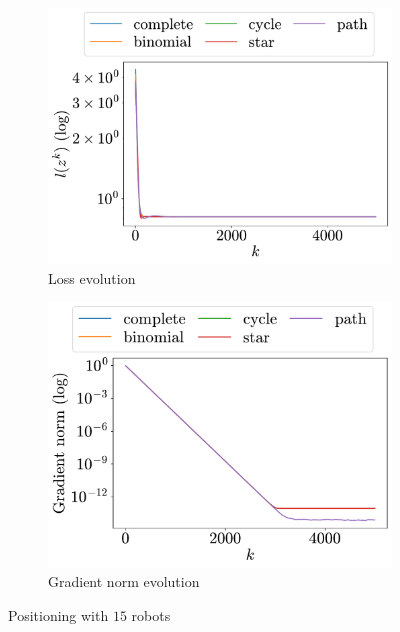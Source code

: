 \documentclass[a4paper,11pt,oneside]{book}
\begin{document}
\begin{figure}[H]
      \centering
      \begin{subfigure}[t]{0.46\linewidth}
            \centering
            \includegraphics[width=\linewidth]{./figs/aggregative/more_agents/loss.pdf} 
            \caption{Loss evolution}
      \end{subfigure}
      \hfill
      \begin{subfigure}[t]{0.46\linewidth}
            \centering
            \includegraphics[width=\linewidth]{./figs/aggregative/more_agents/gradient.pdf} 
            \caption{Gradient norm evolution}
      \end{subfigure}
      \caption{Positioning with $15$ robots}
      \label{fig:positioning_15}
\end{figure}
\end{document}
